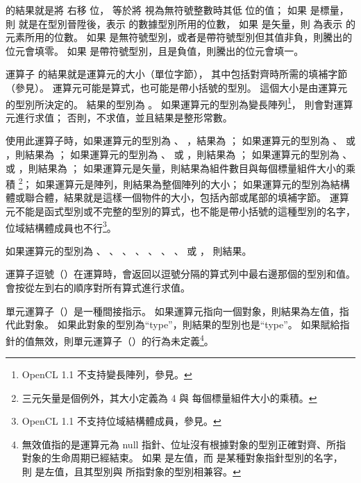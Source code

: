 { 的結果就是將  右移  位，
  等於將  視為無符號整數時其低  位的值；
如果  是標量，則  就是在型別晉陞後，表示  的數據型別所用的位數，
如果  是矢量，則  為表示  的元素所用的位數。
如果  是無符號型別，或者是帶符號型別但其值非負，則騰出的位元會填零。
如果  是帶符號型別，且是負值，則騰出的位元會填一。
\stopitem

\startitem
運算子  的結果就是運算元的大小（單位字節），
其中包括對齊時所需的填補字節（參見）。
運算元可能是算式，也可能是帶小括號的型別。
這個大小是由運算元的型別所決定的。
結果的型別為 。
如果運算元的型別為變長陣列\footnote{OpenCL 1.1 不支持變長陣列，參見。}，
則會對運算元進行求值；
否則，不求值，並且結果是整形常數。

使用此運算子時，如果運算元的型別為 、 ，結果為 ；
如果運算元的型別為 、  或 ，則結果為 ；
如果運算元的型別為 、  或 ，則結果為 ；
如果運算元的型別為 、  或 ，則結果為 ；
如果運算元是矢量，則結果為組件數目與每個標量組件大小的乘積
\footnote{三元矢量是個例外，其大小定義為 4 與 每個標量組件大小的乘積。}；
如果運算元是陣列，則結果為整個陣列的大小；
如果運算元的型別為結構體或聯合體，結果就是這樣一個物件的大小，包括內部或尾部的填補字節。
運算元不能是函式型別或不完整的型別的算式，也不能是帶小括號的這種型別的名字，
位域結構體成員也不行\footnote{OpenCL 1.1 不支持位域結構體成員，參見。}。

如果運算元的型別為 、 、 、
 、 、 、
 、  或 ，
則結果。
\stopitem

\startitem
運算子逗號（\ccmm{,}）在運算時，會返回以逗號分隔的算式列中最右邊那個的型別和值。
會按從左到右的順序對所有算式進行求值。
\stopitem

\startitem
單元運算子（\ccmm{*}）是一種間接指示。
如果運算元指向一個對象，則結果為左值，指代此對象。
如果此對象的型別為“type”，則結果的型別也是“type”。
如果賦給指針的值無效，則單元運算子（\ccmm{*}）的行為未定義\footnote{
無效值指的是運算元為 null 指針、位址沒有根據對象的型別正確對齊、所指對象的生命周期已經結束。
如果  是左值，而  是某種對象指針型別的名字，
則  是左值，且其型別與  所指對象的型別相兼容。
}。
\stopitem

}
